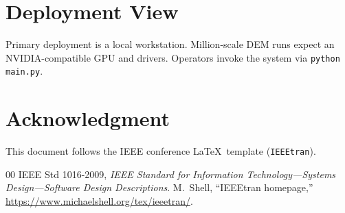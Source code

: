 \documentclass[conference]{ieeetran.cls}
\begin{document}
\section{Deployment View}
Primary deployment is a local workstation. Million-scale DEM runs expect an
NVIDIA-compatible GPU and drivers. Operators invoke the system via
\texttt{python main.py}.

\section*{Acknowledgment}
This document follows the IEEE conference \LaTeX\ template (\texttt{IEEEtran}).

\begin{thebibliography}{00}
 IEEE Std 1016-2009, \emph{IEEE Standard for Information
Technology---Systems Design---Software Design Descriptions}.
 M.~Shell, ``IEEEtran homepage,''
\url{https://www.michaelshell.org/tex/ieeetran/}.
\end{thebibliography}
\end{document}
